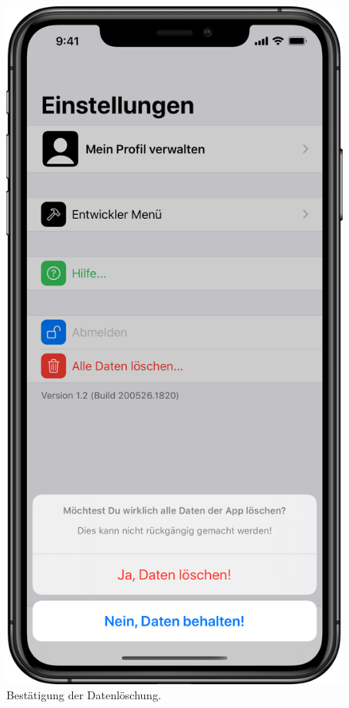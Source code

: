\begin{minipage}{.45\textwidth}
	\begin{figure}[H]
		\centering
		\includegraphics[width=.68\textwidth]{./images/prototype/ios/nukeSheet.png}
		\caption{\label{fig:app:ios:nukeSheet}Bestätigung der Datenlöschung.}
	\end{figure}
\end{minipage}

